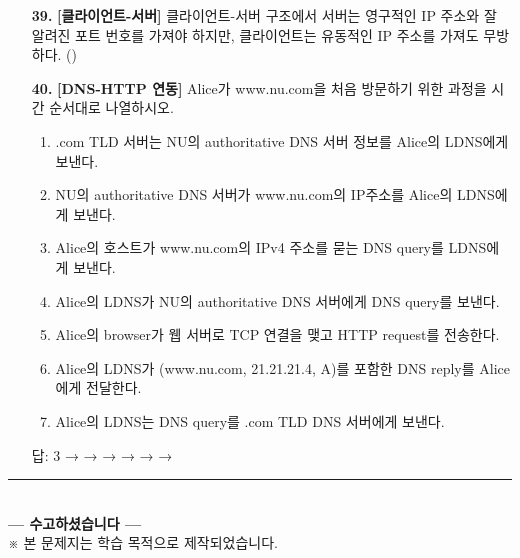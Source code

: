 \documentclass[a4paper, 10pt]{article}
\newcommand{\ansline}[1]{\underline{\hspace{#1}}}
\begin{document}
\begin{enumerate}[itemsep=3em, leftmargin=2em, label={}]
\item[\textbf{39.}] \textbf{[클라이언트-서버]} 클라이언트-서버 구조에서 서버는 영구적인 IP 주소와 잘 알려진 포트 번호를 가져야 하지만, 클라이언트는 유동적인 IP 주소를 가져도 무방하다. (\hspace{1cm})

\item[\textbf{40.}] \textbf{[DNS-HTTP 연동]} Alice가 www.nu.com을 처음 방문하기 위한 과정을 시간 순서대로 나열하시오.

\begin{enumerate}[label=\arabic*., itemsep=0.3em, leftmargin=1.5em, parsep=0pt]
  \item .com TLD 서버는 NU의 authoritative DNS 서버 정보를 Alice의 LDNS에게 보낸다.
  \item NU의 authoritative DNS 서버가 www.nu.com의 IP주소를 Alice의 LDNS에게 보낸다.
  \item Alice의 호스트가 www.nu.com의 IPv4 주소를 묻는 DNS query를 LDNS에게 보낸다.
  \item Alice의 LDNS가 NU의 authoritative DNS 서버에게 DNS query를 보낸다.
  \item Alice의 browser가 웹 서버로 TCP 연결을 맺고 HTTP request를 전송한다.
  \item Alice의 LDNS가 (www.nu.com, 21.21.21.4, A)를 포함한 DNS reply를 Alice에게 전달한다.
  \item Alice의 LDNS는 DNS query를 .com TLD DNS 서버에게 보낸다.
\end{enumerate}

\vspace{0.5em}
\noindent
답: 3 → \ansline{0.8cm} → \ansline{0.8cm} → \ansline{0.8cm} → \ansline{0.8cm} → \ansline{0.8cm} → \ansline{0.8cm}


\end{enumerate}


\vfill

\begin{center}
  \rule{0.9\textwidth}{0.4pt}\\[8pt]
  {\small\textbf{--- 수고하셨습니다 ---}}\\[6pt]
  {\scriptsize ※ 본 문제지는 학습 목적으로 제작되었습니다.}
\end{center}
\end{document}
